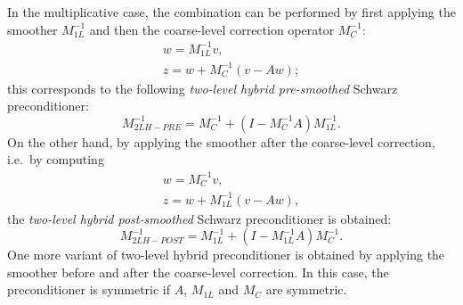 In the multiplicative case, the combination can be
performed by first applying the smoother $M_{1L}^{-1}$ and then
the coarse-level correction operator $M_{C}^{-1}$:
\[
\begin{array}{l}
w = M_{1L}^{-1} v, \\
z = w + M_{C}^{-1} (v-Aw);
\end{array}
\]
this corresponds to the following \emph{two-level hybrid pre-smoothed}
Schwarz preconditioner:
\[
M_{2LH-PRE}^{-1} = M_{C}^{-1} + \left( I - M_{C}^{-1}A \right) M_{1L}^{-1}. 
\]
On the other hand, by applying the smoother after the coarse-level correction,
i.e.\ by computing
\[
\begin{array}{l}
w = M_{C}^{-1} v , \\
z = w + M_{1L}^{-1} (v-Aw) , 
\end{array}
\]
the \emph{two-level hybrid post-smoothed}
Schwarz preconditioner is obtained:
\[
M_{2LH-POST}^{-1} = M_{1L}^{-1} + \left( I - M_{1L}^{-1}A \right) M_{C}^{-1}. 
\]
One more variant of two-level hybrid preconditioner is obtained by applying
the smoother before and after the coarse-level correction. In this case, the
preconditioner is symmetric if $A$, $M_{1L}$ and $M_{C}$ are symmetric.

